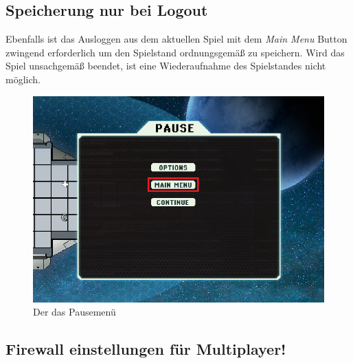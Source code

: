 \documentclass[fontsize=12pt,paper=a4,twoside]{scrartcl}
\begin{document}
\subsection{Speicherung nur bei Logout}

Ebenfalls ist das Ausloggen aus dem aktuellen Spiel mit dem \textit{Main Menu} Button zwingend erforderlich um den Spielstand ordnungsgemäß zu speichern. Wird das Spiel unsachgemäß beendet, ist eine Wiederaufnahme des Spielstandes nicht möglich.

\begin{figure}[H]
\centering
\includegraphics[width=0.8\linewidth]{DasSpiel/known Bugs/Pause-Menu.png}
\caption{Der das Pausemenü}
\end{figure}

\subsection{Firewall einstellungen für Multiplayer!}
\end{document}

